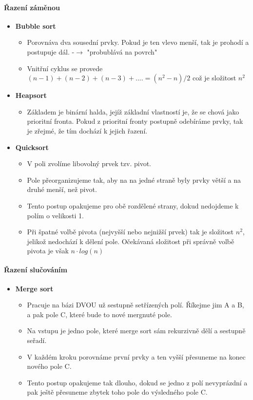 \documentclass[10pt,a4paper]{article}
\begin{document}
\paragraph{Řazení záměnou}
\begin{itemize}
\item \textbf{Bubble sort}
\begin{itemize}
\item Porovnáva dva sousední prvky. Pokud je ten vlevo menší, tak je prohodí a postupuje dál. -$\rightarrow$ "probublává na povrch"
\item Vnitřní cyklus se provede $(n-1) + (n-2) + (n-3) +.... = (n^2 - n)/2$ což je složitost $n^2$
\end{itemize}
\item \textbf{Heapsort}
\begin{itemize}
\item Základem je binární halda, jejíž základní vlastností je, že se chová jako prioritní fronta. Pokud z prioritní fronty postupně odebíráme prvky, tak je zřejmé, že tím dochází k jejich řazení.
\end{itemize}
\item \textbf{Quicksort}
\begin{itemize}
\item V poli zvolíme libovolný prvek tzv. pivot.
\item Pole přeorganizujeme tak, aby na na jedné straně byly prvky větší a na druhé menší, než pivot.
\item Tento postup opakujeme pro obě rozdělené strany, dokud nedojdeme k polím o velikosti 1.
\item Při špatné volbě pivota (nejvyšší nebo nejnižší prvek) tak je složitost $n^2$, jelikož nedochází k dělení pole. Očekávaná složitost při správně volbě pivota je však $n \cdot log(n)$
\end{itemize}
\end{itemize}
\paragraph{Řazení slučováním}
\begin{itemize}
\item \textbf{Merge sort}
\begin{itemize}
\item Pracuje na bázi DVOU už sestupně setřízených polí. Říkejme jim A a B, a pak pole C, které bude to nové mergnuté pole.
\item Na vstupu je jedno pole, které merge sort sám rekurzivně dělí a sestupně seřadí.
\item V každém kroku porovnáme první prvky a ten vyšší přesuneme na konec nového pole C.
\item Tento postup opakujeme tak dlouho, dokud se jedno z polí nevyprázdní a pak ještě přesuneme zbytek toho pole do výsledného pole C.
\end{itemize}
\end{itemize}
\end{document}
